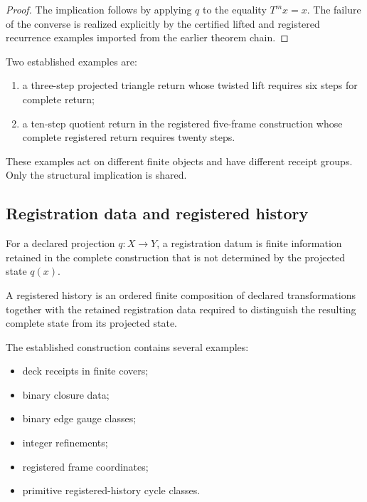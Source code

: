 \begin{proof}
The implication follows by applying \(q\) to the equality
\(T^{m}x=x\).  The failure of the converse is realized explicitly by
the certified lifted and registered recurrence examples imported from
the earlier theorem chain.
\end{proof}

Two established examples are:

\begin{enumerate}[label=(\roman*)]
\item a three-step projected triangle return whose twisted lift
requires six steps for complete return;

\item a ten-step quotient return in the registered five-frame
construction whose complete registered return requires twenty steps.
\end{enumerate}

These examples act on different finite objects and have different
receipt groups.  Only the structural implication is shared.

\subsection{Registration data and registered history}

\begin{definition}
For a declared projection \(q:X\to Y\), a registration datum is
finite information retained in the complete construction that is not
determined by the projected state \(q(x)\).
\end{definition}

\begin{definition}
A registered history is an ordered finite composition of declared
transformations together with the retained registration data required
to distinguish the resulting complete state from its projected state.
\end{definition}

The established construction contains several examples:

\begin{itemize}
\item deck receipts in finite covers;
\item binary closure data;
\item binary edge gauge classes;
\item integer refinements;
\item registered frame coordinates;
\item primitive registered-history cycle classes.
\end{itemize}

